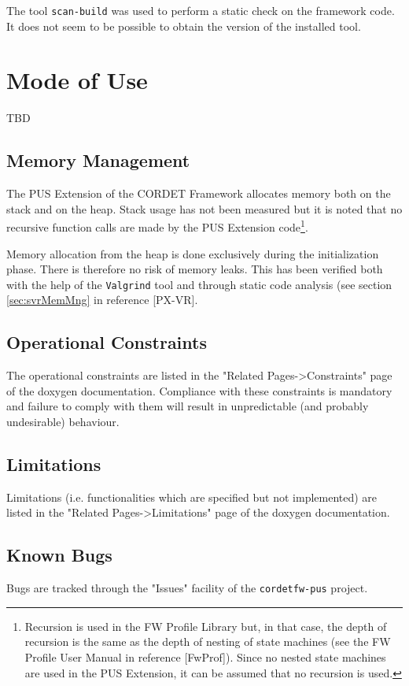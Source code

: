 \documentclass{pnp_article}
\begin{document}
The tool \texttt{scan-build} was used to perform a static check on the framework code. It does not seem to be possible to obtain the version of the installed tool.



\section{Mode of Use}
TBD


\subsection{Memory Management}
The PUS Extension of the CORDET Framework allocates memory both on the stack and on the heap. Stack usage has not been measured but it is noted that no recursive function calls are made by the PUS Extension code\footnote{Recursion is used in the FW Profile Library but, in that case, the depth of recursion is the same as the depth of nesting of state machines (see the FW Profile User Manual in reference [FwProf]). Since no nested state machines are used in the PUS Extension, it can be assumed that no recursion is used.}.

Memory allocation from the heap is done exclusively during the initialization phase. There is therefore no risk of memory leaks. This has been verified both with the help of the \texttt{Valgrind} tool and through static code analysis (see section \ref{sec:svrMemMng} in reference [PX-VR]. 

\subsection{Operational Constraints}
The operational constraints are listed in the "Related Pages->Constraints" page of the doxygen documentation. Compliance with these constraints is mandatory and failure to comply with them will result in unpredictable (and probably undesirable) behaviour.


\subsection{Limitations}
Limitations (i.e. functionalities which are specified but not implemented) are listed in the "Related Pages->Limitations" page of the doxygen documentation.

\subsection{Known Bugs}
Bugs are tracked through the "Issues" facility of the \texttt{cordetfw-pus} project.
\end{document}
